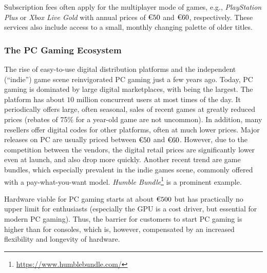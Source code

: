 Subscription fees often apply for the multiplayer mode of games, e.g.,
\textit{PlayStation Plus} or \textit{Xbox Live Gold} with annual prices
of $\text{\texteuro} 50$ and $\text{\texteuro} 60$, respectively. These
services also include access to a small, monthly changing palette of
older titles.




\subsubsection{The PC Gaming Ecosystem}
\label{sec:pcgaming}

The rise of easy-to-use digital distribution platforms and the
independent (``indie'') game scene reinvigorated PC gaming just a few
years ago. Today, PC gaming is dominated by large digital marketplaces,
with \steam being the largest. The platform has about $10$ million
concurrent users at most times of the day. It periodically offers large,
often seasonal, sales of recent games at greatly reduced prices (rebates
of 75\% for a year-old game are not uncommon). In addition, many
resellers offer digital codes for other platforms, often at much lower
prices.
Major releases on PC are usually priced between $\text{\texteuro} 50$
and $\text{\texteuro} 60$. However, due to the competition between the
vendors, the digital retail prices are significantly lower even at
launch, and also drop more quickly. Another recent trend are game
bundles, which especially prevalent in the indie games scene, commonly
offered with a pay-what-you-want model. \textit{Humble
Bundle}\footnote{\url{https://www.humblebundle.com/}} is a prominent
example.


Hardware viable for PC gaming starts at about $\text{\texteuro} 500$ but
has practically no upper limit for enthusiasts (especially the \gls{GPU}
is a cost driver, but essential for modern PC gaming). Thus, the barrier
for customers to start PC gaming is higher than for consoles, which is,
however, compensated by an increased flexibility and longevity of
hardware.

